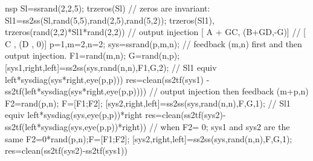 \begin{examples}
  \begin{mintednsp}{nsp}
    Sl=ssrand(2,2,5); trzeros(Sl)       // zeros are invariant:
    Sl1=ss2ss(Sl,rand(5,5),rand(2,5),rand(5,2)); 
    trzeros(Sl1), trzeros(rand(2,2)*Sl1*rand(2,2))
    // output injection [ A + GC, (B+GD,-G)]
    //                  [   C   , (D   , 0)]
    p=1,m=2,n=2; sys=ssrand(p,m,n);
    // feedback (m,n)  first and then output injection.
    F1=rand(m,n);
    G=rand(n,p);
    [sys1,right,left]=ss2ss(sys,rand(n,n),F1,G,2);
    // Sl1 equiv left*sysdiag(sys*right,eye(p,p)))
    res=clean(ss2tf(sys1) - ss2tf(left*sysdiag(sys*right,eye(p,p))))
    // output injection then feedback (m+p,n) 
    F2=rand(p,n); F=[F1;F2];
    [sys2,right,left]=ss2ss(sys,rand(n,n),F,G,1);
    // Sl1 equiv left*sysdiag(sys,eye(p,p))*right 
    res=clean(ss2tf(sys2)-ss2tf(left*sysdiag(sys,eye(p,p))*right))
    // when F2= 0; sys1 and sys2 are the same 
    F2=0*rand(p,n);F=[F1;F2];
    [sys2,right,left]=ss2ss(sys,rand(n,n),F,G,1);
    res=clean(ss2tf(sys2)-ss2tf(sys1))
  \end{mintednsp}
\end{examples}
\begin{manseealso}
     
\end{manseealso}
